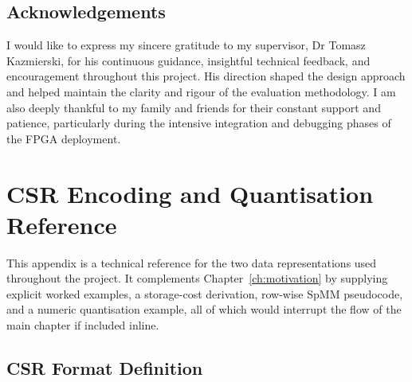 \documentclass[oneside]{ecsproject}    %
\begin{document}
\section*{Acknowledgements}
I would like to express my sincere gratitude to my supervisor, Dr Tomasz Kazmierski,
for his continuous guidance, insightful technical feedback, and encouragement
throughout this project. His direction shaped the design approach and helped
maintain the clarity and rigour of the evaluation methodology. I am also
deeply thankful to my family and friends for their constant support and
patience, particularly during the intensive integration and debugging phases
of the FPGA deployment.


\tableofcontents

\mainmatter















\appendix
{}

\chapter[Appendix A: CSR Encoding and Quantisation Reference]{CSR Encoding and Quantisation Reference}
\label{app:spmm-background}

This appendix is a technical reference for the two data representations used
throughout the project. It complements Chapter~\ref{ch:motivation} by supplying
explicit worked examples, a storage-cost derivation, row-wise SpMM pseudocode,
and a numeric quantisation example, all of which would interrupt the flow of
the main chapter if included inline.

\section{CSR Format Definition}
\end{document}
